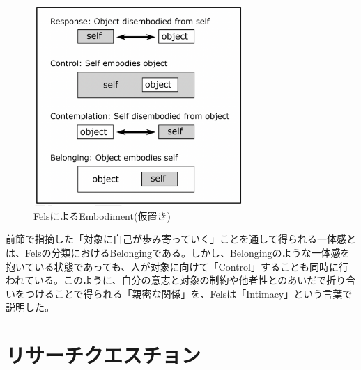 \begin{figure}[H]
  \centering
  \includegraphics[width=8cm]{img/fels_diagram.png}
  \caption{FelsによるEmbodiment(仮置き)}
  \label{fig:fels_embodiment}
\end{figure}



前節で指摘した「対象に自己が歩み寄っていく」ことを通して得られる一体感とは、Felsの分類におけるBelongingである。しかし、Belongingのような一体感を抱いている状態であっても、人が対象に向けて「Control」することも同時に行われている。このように、自分の意志と対象の制約や他者性とのあいだで折り合いをつけることで得られる「親密な関係」を、Felsは「Intimacy」という言葉で説明した。

\section{リサーチクエスチョン}

